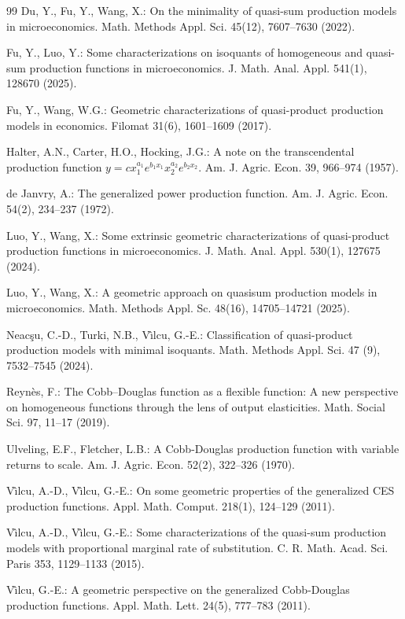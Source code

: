 \documentclass[12pt]{amsart}
\begin{document}
\begin{thebibliography}{99}
 Du, Y., Fu, Y., Wang, X.: On the minimality of quasi-sum production models in microeconomics. Math. Methods Appl. Sci. 45(12), 7607--7630 (2022).

 Fu, Y., Luo, Y.: Some characterizations on isoquants of homogeneous and quasi-sum production functions in microeconomics.
J. Math. Anal. Appl. 541(1), 128670 (2025).

  Fu, Y.,  Wang, W.G.: Geometric characterizations of quasi-product production models in economics. Filomat 31(6), 1601--1609 (2017).

 Halter, A.N., Carter, H.O., Hocking, J.G.: A note on the transcendental production function $y=cx_1^{a_1}e^{b_1x_1}x_2^{a_2}e^{b_2x_2}$. Am. J. Agric. Econ. 39, 966--974 (1957).

de Janvry, A.:  The generalized power production function. Am. J. Agric. Econ. 54(2), 234--237 (1972).

 Luo, Y., Wang, X.: Some extrinsic geometric characterizations of quasi-product production functions in microeconomics. J. Math. Anal. Appl. 530(1),  127675 (2024).

Luo, Y., Wang, X.: A geometric approach on quasisum production models in microeconomics. Math. Methods Appl. Sc. 48(16), 14705--14721 (2025).

 Neac\c{s}u, C.-D.,  Turki, N.B., V\^{\i}lcu,  G.-E.: Classification of quasi-product production models with minimal isoquants. Math. Methods Appl. Sci. 47 (9),  7532--7545 (2024).

Reynès, F.:  The Cobb--Douglas function as a flexible function: A new perspective on homogeneous functions through the lens of output elasticities. Math. Social Sci. 97, 11--17 (2019).


Ulveling, E.F., Fletcher, L.B.:  A Cobb-Douglas production function with variable returns to scale. Am. J. Agric. Econ. 52(2), 322--326 (1970).

  V\^{\i}lcu,  A.-D., V\^{\i}lcu,  G.-E.:  On some geometric properties of the generalized CES production functions.
       Appl. Math. Comput. 218(1),  124--129 (2011).

 V\^{\i}lcu,  A.-D., V\^{\i}lcu,  G.-E.: Some characterizations of the quasi-sum production models with proportional marginal rate of substitution. C. R. Math. Acad. Sci. Paris 353, 1129--1133 (2015).

 V\^{\i}lcu,  G.-E.: A geometric perspective on the generalized Cobb-Douglas production functions.
       Appl. Math. Lett. 24(5),  777--783 (2011).

\end{thebibliography}
\end{document}
